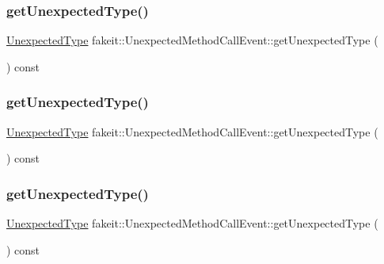 \subsubsection{\texorpdfstring{getUnexpectedType()}{getUnexpectedType()}\hspace{0.1cm}{\footnotesize\ttfamily [7/9]}}
{\footnotesize\ttfamily \mbox{\hyperlink{namespacefakeit_ae284671dc00c0fa5ee2aa4a6af02743b}{Unexpected\+Type}} fakeit\+::\+Unexpected\+Method\+Call\+Event\+::get\+Unexpected\+Type (\begin{DoxyParamCaption}{ }\end{DoxyParamCaption}) const\hspace{0.3cm}{\ttfamily [inline]}}

\mbox{\label{structfakeit_1_1UnexpectedMethodCallEvent_a85b14cb613e543dff7e3c491f643ad7b}} 
\subsubsection{\texorpdfstring{getUnexpectedType()}{getUnexpectedType()}\hspace{0.1cm}{\footnotesize\ttfamily [8/9]}}
{\footnotesize\ttfamily \mbox{\hyperlink{namespacefakeit_ae284671dc00c0fa5ee2aa4a6af02743b}{Unexpected\+Type}} fakeit\+::\+Unexpected\+Method\+Call\+Event\+::get\+Unexpected\+Type (\begin{DoxyParamCaption}{ }\end{DoxyParamCaption}) const\hspace{0.3cm}{\ttfamily [inline]}}

\mbox{\label{structfakeit_1_1UnexpectedMethodCallEvent_a85b14cb613e543dff7e3c491f643ad7b}} 
\subsubsection{\texorpdfstring{getUnexpectedType()}{getUnexpectedType()}\hspace{0.1cm}{\footnotesize\ttfamily [9/9]}}
{\footnotesize\ttfamily \mbox{\hyperlink{namespacefakeit_ae284671dc00c0fa5ee2aa4a6af02743b}{Unexpected\+Type}} fakeit\+::\+Unexpected\+Method\+Call\+Event\+::get\+Unexpected\+Type (\begin{DoxyParamCaption}{ }\end{DoxyParamCaption}) const\hspace{0.3cm}{\ttfamily [inline]}}



